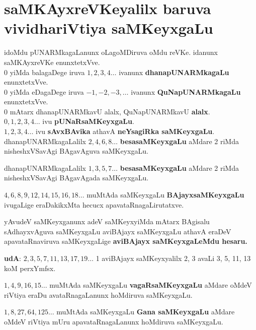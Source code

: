 \chapter{saMKAyxreVKeyalilx baruva vividhariVtiya saMKeyxgaLu}

\begin{figure}[!h]
\end{figure}
idoMdu pUNARMkagaLanunx oLagoMDiruva oMdu reVKe. idanunx saMKAyxreVKe enunxtetxVve.\\ 
$0$ yiMda balagaDege iruva $1,2,3,4\ldots$ ivanunx \textbf{dhanapUNARMkagaLu} enunxtetxVve.\\
$0$ yiMda eDagaDege iruva $-1, -2, -3, \ldots$ ivanunx \textbf{QuNapUNARMkagaLu} enunxtetxVve.\\
$0$ mAtarx dhanapUNARMkavU alalx, QuNapUNARMkavU \textbf{alalx}.\\
$0, 1, 2, 3, 4\ldots$ ivu \textbf{pUNaRsaMKeyxgaLu}.\\
$1, 2, 3, 4\ldots$ ivu \textbf{sAvxBAvika} athavA \textbf{neYsagiRka saMKeyxgaLu}.\\

dhanapUNARMkagaLalilx $2, 4, 6, 8\ldots$ \textbf{besasaMKeyxgaLu} aMdare {\rm 2} riMda nisheshxVSavAgi BAgavAguva saMKeyxgaLu.

dhanapUNARMkagaLalilx $1, 3, 5, 7\ldots$ \textbf{besasaMKeyxgaLu} aMdare {\rm 2} riMda nisheshxVSavAgi BAgavAgada saMKeyxgaLu.

$4, 6, 8, 9, 12, 14, 15, 16, 18\ldots$ muMtAda saMKeyxgaLu \textbf{BAjayxsaMKeyxgaLu} ivugaLige eraDakikxMta hecucx apavataRnagaLirutatxve.

yAvudeV saMKeyxganunx adeV saMKeyxyiMda mAtarx BAgisalu sAdhayxvAguva saMKeyxgaLu aviBAjayx saMKeyxgaLu athavA eraDeV apavataRnaviruva saMKeyxgaLige \textbf{aviBAjayx saMKeyxgaLeMdu hesaru.}

\textbf{udA}: $2, 3, 5, 7, 11, 13, 17, 19 \ldots$ {\rm 1} aviBAjayx saMKeyxyalilx {\rm 2, 3} avaLi {\-\rm 3, 5}, {\rm 11, 13} koM perxYmfsx.

$1, 4, 9, 16, 15\ldots$ muMtAda saMKeyxgaLu \textbf{vagaRsaMKeyxgaLu} aMdare oMdeV riVtiya eraDu avataRnagaLanunx hoMdiruva saMKeyxgaLu.

$1, 8, 27, 64, 125\ldots$ muMtAda saMKeyxgaLu \textbf{Gana saMKeyxgaLu} aMdare oMdeV riVtiya mUru apavataRnagaLanunx hoMdiruva saMKeyxgaLu.

